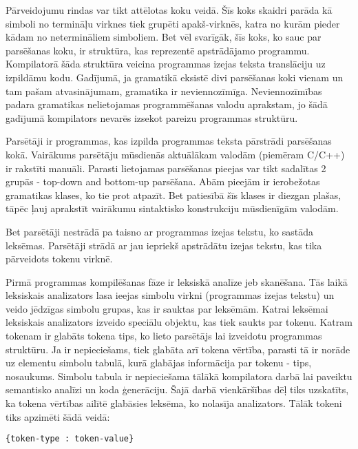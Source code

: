 Pārveidojumu rindas var tikt attēlotas koku veidā. Šīs koks skaidri parāda kā simboli no termināļu virknes tiek grupēti apakš-virknēs, katra no kurām pieder kādam no netermināliem simboliem. Bet vēl svarīgāk, šīs koks, ko sauc par parsēšanas koku, ir struktūra, kas reprezentē apstrādājamo programmu. Kompilatorā šāda struktūra veicina programmas izejas teksta translāciju uz izpildāmu kodu. Gadījumā, ja gramatikā eksistē divi parsēšanas koki vienam un tam pašam atvasinājumam, gramatika ir neviennozīmīga. Neviennozīmības padara gramatikas nelietojamas programmēšanas valodu aprakstam, jo šādā gadījumā kompilators nevarēs izsekot pareizu programmas struktūru. \cite{Hopcroft:IntroAutomataTheory}

Parsētāji ir programmas, kas izpilda programmas teksta pārstrādi parsēšanas kokā. Vairākums parsētāju mūsdienās aktuālākam valodām (piemēram C/C++) ir rakstīti manuāli. Parasti lietojamas parsēšanas pieejas var tikt sadalītas 2 grupās - top-down and bottom-up parsēšana. Abām pieejām ir ierobežotas gramatikas klases, ko tie prot atpazīt. Bet patiesībā šīs klases ir diezgan plašas, tāpēc ļauj aprakstīt vairākumu sintaktisko konstrukciju mūsdienīgām valodām.\cite{DragonBook}


Bet parsētāji nestrādā pa taisno ar programmas izejas tekstu, ko sastāda leksēmas. Parsētāji strādā ar jau iepriekš apstrādātu izejas tekstu, kas tika pārveidots tokenu virknē.

Pirmā programmas kompilēšanas fāze ir leksiskā analīze jeb skanēšana. Tās laikā leksiskais analizators lasa ieejas simbolu virkni (programmas izejas tekstu) un veido jēdzīgas simbolu grupas, kas ir sauktas par leksēmām. Katrai leksēmai leksiskais analizators izveido speciālu objektu, kas tiek saukts par tokenu. Katram tokenam ir glabāts tokena tips, ko lieto parsētājs lai izveidotu programmas struktūru. Ja ir nepieciešams, tiek glabāta arī tokena vērtība, parasti tā ir norāde uz elementu simbolu tabulā, kurā glabājas informācija par tokenu - tips, nosaukums. Simbolu tabula ir nepieciešama tālākā kompilatora darbā lai paveiktu semantisko analīzi un koda ģenerāciju. Šajā darbā vienkāršības dēļ tiks uzskatīts, ka tokena vērtības ailītē glabāsies   leksēma, ko nolasīja analizators. Tālāk tokeni tiks apzimēti šādā veidā:

\begin{verbatim}
{token-type : token-value}
\end{verbatim}

